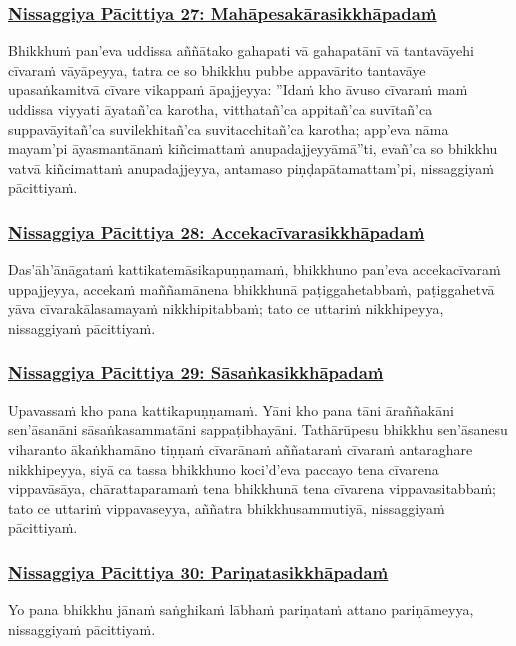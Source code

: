 \subsubsection*{\hyperref[forf-exp27]{Nissaggiya Pācittiya 27: Mahāpesakārasikkhāpadaṁ}}
\label{np27}
Bhikkhuṁ pan'eva uddissa aññātako gahapati vā gahapatānī vā tantavāyehi cīvaraṁ vāyāpeyya, tatra ce so bhikkhu pubbe appavārito tantavāye upasaṅkamitvā cīvare vikappaṁ āpajjeyya: ''Idaṁ kho āvuso cīvaraṁ maṁ uddissa viyyati āyatañ'ca karotha, vitthatañ'ca appitañ'ca suvītañ'ca suppavāyitañ'ca suvilekhitañ'ca suvitacchitañ'ca karotha; app'eva nāma mayam'pi āyasmantānaṁ kiñcimattaṁ anupadajjeyyāmā''ti, evañ'ca so bhikkhu vatvā kiñcimattaṁ anupadajjeyya, antamaso piṇḍapātamattam'pi, nissaggiyaṁ pācittiyaṁ.

\subsubsection*{\hyperref[forf-exp28]{Nissaggiya Pācittiya 28: Accekacīvarasikkhāpadaṁ}}
\label{np28}
Das'āh'ānāgataṁ kattikatemāsikapuṇṇamaṁ, bhikkhuno pan'eva accekacīvaraṁ uppajjeyya, accekaṁ maññamānena bhikkhunā paṭiggahetabbaṁ, paṭiggahetvā yāva cīvarakālasamayaṁ nikkhipitabbaṁ; tato ce uttariṁ nikkhipeyya, nissaggiyaṁ pācittiyaṁ.

\subsubsection*{\hyperref[forf-exp29]{Nissaggiya Pācittiya 29: Sāsaṅkasikkhāpadaṁ}}
\label{np29}
Upavassaṁ kho pana kattikapuṇṇamaṁ. Yāni kho pana tāni āraññakāni sen'āsanāni sāsaṅkasammatāni sappaṭibhayāni. Tathārūpesu bhikkhu sen'āsanesu viharanto ākaṅkhamāno tiṇṇaṁ cīvarānaṁ aññataraṁ cīvaraṁ antaraghare nikkhipeyya, siyā ca tassa bhikkhuno koci'd'eva paccayo tena cīvarena vippavāsāya, chārattaparamaṁ tena bhikkhunā tena cīvarena vippavasitabbaṁ; tato ce uttariṁ vippavaseyya, aññatra bhikkhusammutiyā, nissaggiyaṁ pācittiyaṁ.

\subsubsection*{\hyperref[forf-exp30]{Nissaggiya Pācittiya 30: Pariṇatasikkhāpadaṁ}}
\label{np30}
Yo pana bhikkhu jānaṁ saṅghikaṁ lābhaṁ pariṇataṁ attano pariṇāmeyya, nissaggiyaṁ pācittiyaṁ.

